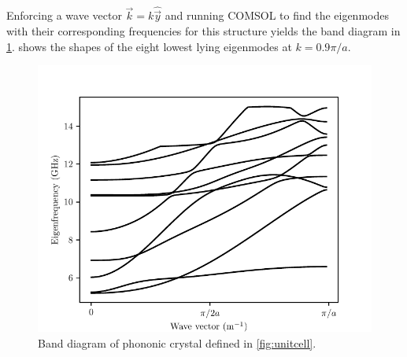 Enforcing a wave vector $\vec k = k\hat{\vec y}$ and running COMSOL to find the eigenmodes with their
corresponding frequencies for this structure yields the band diagram in
\cref{fig:banddiagram}.
 shows the shapes of the eight lowest lying eigenmodes at
$k=0.9 \pi / a$.
\begin{figure}[htpb]
	\centering
	\includegraphics{chapters/theory/bandstructure.pdf}
	\caption{
		Band diagram of phononic crystal defined in \cref{fig:unitcell}.
	}%
	\label{fig:banddiagram}
\end{figure}

